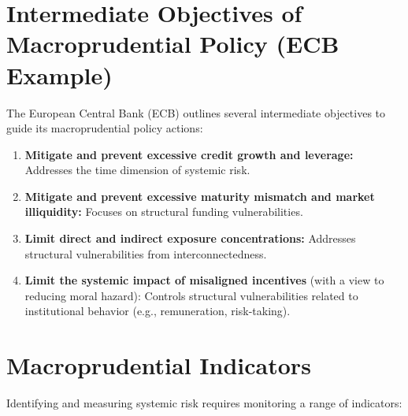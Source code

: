 \section{Intermediate Objectives of Macroprudential Policy (ECB Example)}

The European Central Bank (ECB) outlines several intermediate objectives to guide its macroprudential policy actions:
\begin{enumerate}
    \item \textbf{Mitigate and prevent excessive credit growth and leverage:} Addresses the time dimension of systemic risk.
    \item \textbf{Mitigate and prevent excessive maturity mismatch and market illiquidity:} Focuses on structural funding vulnerabilities.
    \item \textbf{Limit direct and indirect exposure concentrations:} Addresses structural vulnerabilities from interconnectedness.
    \item \textbf{Limit the systemic impact of misaligned incentives} (with a view to reducing moral hazard): Controls structural vulnerabilities related to institutional behavior (e.g., remuneration, risk-taking).
\end{enumerate}

\section{Macroprudential Indicators}

Identifying and measuring systemic risk requires monitoring a range of indicators:

